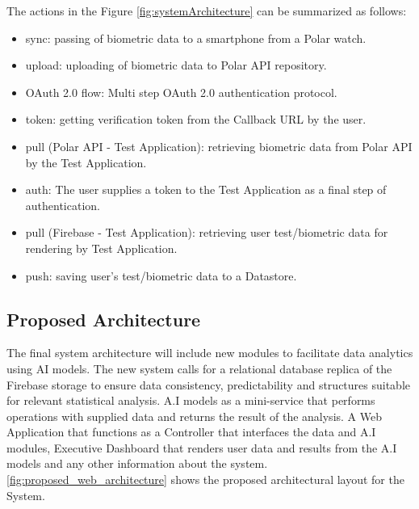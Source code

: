 The actions in the Figure \autoref{fig:systemArchitecture} can be summarized as follows:
\begin{itemize}
\item{sync}: passing of biometric data to a smartphone from a Polar watch.
\item {upload}: uploading of biometric data to Polar API repository.
\item {OAuth 2.0 flow}: Multi step OAuth 2.0 authentication protocol. 
\item {token}: getting verification token from the Callback URL by the user.
\item {pull (Polar API - Test Application)}: retrieving biometric data from Polar API by the Test Application.
\item {auth}: The user supplies a token to the Test Application as a final step of authentication. 
\item {pull (Firebase - Test Application)}: retrieving user test/biometric data for rendering by Test Application.
\item {push}: saving user's test/biometric data to a Datastore.
\end{itemize}

\subsection*{Proposed Architecture}
The final system architecture will include new modules to facilitate data analytics using AI models. The new system calls for a relational database replica of the Firebase storage to ensure data consistency, predictability and structures suitable for relevant statistical analysis. A.I models as a mini-service that performs operations with supplied data and returns the result of the analysis. A Web Application that functions as a Controller that interfaces the data and A.I modules, Executive Dashboard that renders user data and results from the A.I models and any other information about the system.\\
\autoref{fig:proposed_web_architecture} shows the proposed architectural layout for the System.\\


